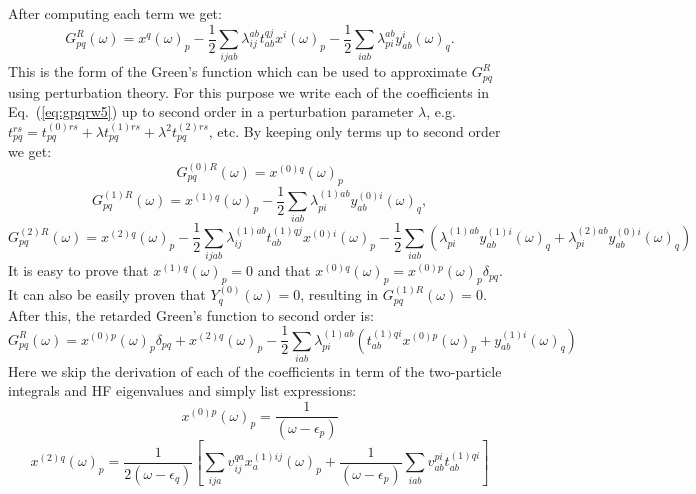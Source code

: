 \documentclass[aps,prb,preprint,groupaddress,floatfix]{revtex4}
\begin{document}
After computing each term we get:
\begin{equation}
\label{eq:gpqrw5}
G^R_{pq} (\omega) =
x^q(\omega)_p -\frac{1}{2} \sum_{ijab} \lambda^{ab}_{ij} t^{qj}_{ab}
x^i(\omega)_p
-\frac{1}{2} \sum_{iab} \lambda^{ab}_{pi} y^{i}_{ab}(\omega)_q.
\end{equation}
This is the form of the Green's function which can be used to approximate $G^R_{pq}$ using perturbation theory. For this purpose we
write each of the coefficients in Eq.\ (\ref{eq:gpqrw5}) up to second order in a perturbation parameter $\lambda$, e.g. $t_{pq}^{rs} = t_{pq}^{(0)rs} + \lambda t_{pq}^{(1)rs} + \lambda^2 t_{pq}^{(2)rs}$, etc. By
keeping only terms up to second order we get:
\begin{equation}
\label{eq:g0pqrw1}
G^{(0)R}_{pq}(\omega) = x^{(0)q}(\omega)_p
\end{equation}
\begin{equation}
\label{eq:g1pqrw1}
G^{(1)R}_{pq}(\omega) = x^{(1)q}(\omega)_p
-\frac{1}{2} \sum_{iab} \lambda^{(1)ab}_{pi} y^{(0)i}_{ab}(\omega)_q,
\end{equation}
\begin{equation}
\label{eq:g2pqrw1}
G^{(2)R}_{pq}(\omega) =
x^{(2)q}(\omega)_p
-\frac{1}{2} \sum_{ijab} \lambda^{(1)ab}_{ij} t^{(1)qj}_{ab} x^{(0)i}(\omega)_p
-\frac{1}{2} \sum_{iab} (\lambda^{(1)ab}_{pi} y^{(1)i}_{ab}(\omega)_q +
\lambda^{(2)ab}_{pi} y^{(0)i}_{ab}(\omega)_q)
\end{equation}
It is easy to prove that $x^{(1)q}(\omega)_p=0$ and that
$x^{(0)q}(\omega)_p = x^{(0)p}(\omega)_p \delta_{pq}$. It can also be easily
proven that $Y^{(0)}_q(\omega) = 0$, resulting in $G^{(1)R}_{pq} (\omega) =0$.
After this, the retarded Green's function to second order is:
\begin{equation}
\label{eq:g2pqrw}
G^{R}_{pq} (\omega) =
x^{(0)p}(\omega)_p \delta_{pq} + x^{(2)q}(\omega)_p
-\frac{1}{2} \sum_{iab} \lambda^{(1)ab}_{pi}
(t^{(1)qi}_{ab} x^{(0)p}(\omega)_p + y^{(1)i}_{ab}(\omega)_q)
\end{equation}
Here we skip the derivation of each of the coefficients in term of the two-particle integrals and HF eigenvalues and simply list expressions:
\begin{equation}
\label{eq:x0w}
x^{(0)p}(\omega)_p = \frac{1}{(\omega-\epsilon_p)}
\end{equation}
\begin{equation}
\label{eq:x2w}
x^{(2)q}(\omega)_p = \frac{1}{2(\omega-\epsilon_q)}\left[
\sum_{ija} v^{qa}_{ij} x^{(1)ij}_{a}(\omega)_p + \right.
\left.\frac{1}{(\omega-\epsilon_p)}
\sum_{iab} v^{pi}_{ab} t^{(1)qi}_{ab} \right]
\end{equation}
\end{document}
